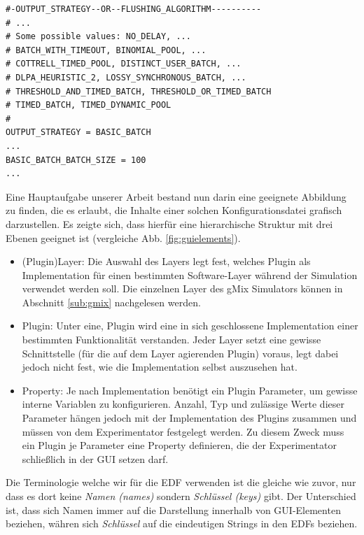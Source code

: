 \documentclass[a4paper, 11pt]{article} %
\begin{document}
\newpage

\begin{lstlisting}[caption={Auszug aus einer Simulator Konfiguration},label=lst:edf,frame=lrtb]
#-OUTPUT_STRATEGY--OR--FLUSHING_ALGORITHM----------
# ...
# Some possible values: NO_DELAY, ... 
# BATCH_WITH_TIMEOUT, BINOMIAL_POOL, ... 
# COTTRELL_TIMED_POOL, DISTINCT_USER_BATCH, ... 
# DLPA_HEURISTIC_2, LOSSY_SYNCHRONOUS_BATCH, ...
# THRESHOLD_AND_TIMED_BATCH, THRESHOLD_OR_TIMED_BATCH 
# TIMED_BATCH, TIMED_DYNAMIC_POOL
#	
OUTPUT_STRATEGY = BASIC_BATCH
...
BASIC_BATCH_BATCH_SIZE = 100
...
\end{lstlisting}

Eine Hauptaufgabe unserer Arbeit bestand nun darin eine geeignete Abbildung zu finden, die es erlaubt, die Inhalte einer solchen Konfigurationsdatei grafisch darzustellen. Es zeigte sich, dass hierfür eine hierarchische Struktur mit drei Ebenen geeignet ist (vergleiche Abb. \ref{fig:guielements}).

\begin{itemize}
	\item (Plugin)Layer: Die Auswahl des Layers legt fest, welches Plugin als Implementation für einen bestimmten Software-Layer während der Simulation verwendet werden soll. Die einzelnen Layer des gMix Simulators können in Abschnitt \ref{sub:gmix} nachgelesen werden. 
	\item Plugin: Unter eine, Plugin wird eine in sich geschlossene Implementation einer bestimmten Funktionalität verstanden. Jeder Layer setzt eine gewisse Schnittstelle (für die auf dem Layer agierenden Plugin) voraus, legt dabei jedoch nicht fest, wie die Implementation selbst auszusehen hat.
	\item Property: Je nach Implementation benötigt ein Plugin Parameter, um gewisse interne Variablen zu konfigurieren. Anzahl, Typ und zulässige Werte dieser Parameter hängen jedoch mit der Implementation des Plugins zusammen und müssen von dem Experimentator festgelegt werden. Zu diesem Zweck muss ein Plugin je Parameter eine Property definieren, die der Experimentator schließlich in der GUI setzen darf.
\end{itemize} 

Die Terminologie welche wir für die EDF verwenden ist die gleiche wie zuvor, nur dass es dort keine \emph{Namen (names)} sondern \emph{Schlüssel (keys)} gibt. Der Unterschied ist, dass sich Namen immer auf die Darstellung innerhalb von GUI-Elementen beziehen, währen sich \emph{Schlüssel} auf die eindeutigen Strings in den EDFs beziehen.
\end{document}
